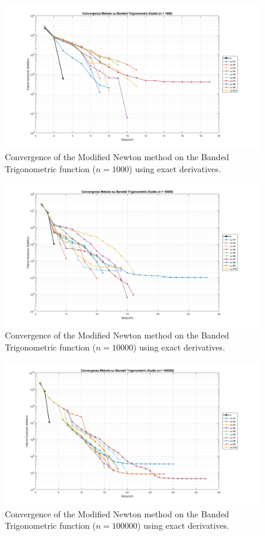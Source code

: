 \documentclass[a4paper,12pt]{article}
\begin{document}
	\begin{figure}[htbp]
		\centering
		\includegraphics[width=\textwidth]{../immagini/banded_1k.png}
		\caption{Convergence of the Modified Newton method on the Banded Trigonometric function ($n=1000$) using exact derivatives.}
		\label{fig:bt_1k_exact}
	\end{figure}
	
	\begin{figure}[htbp]
		\centering
		\includegraphics[width=\textwidth]{../immagini/banded_10k.png}
		\caption{Convergence of the Modified Newton method on the Banded Trigonometric function ($n=10000$) using exact derivatives.}
		\label{fig:bt_10k_exact}
	\end{figure}
	
	\begin{figure}[htbp]
		\centering
		\includegraphics[width=\textwidth]{../immagini/banded_100k.png}
		\caption{Convergence of the Modified Newton method on the Banded Trigonometric function ($n=100000$) using exact derivatives.}
		\label{fig:bt_100k_exact}
	\end{figure}
	
\end{document}
